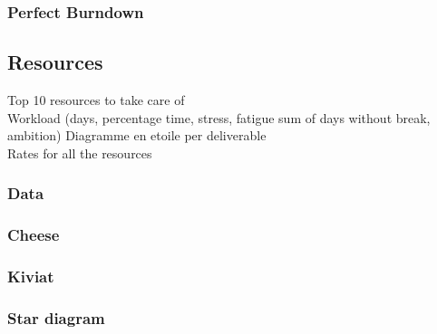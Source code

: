 \documentclass[8pt]{article} %
\begin{document}



\subsubsection{Perfect Burndown}
%


%

\subsection{Resources}

Top 10 resources to take care of\\
Workload (days, percentage time, stress, fatigue sum of days without break, ambition)
Diagramme en etoile per deliverable\\
Rates for all the resources

\subsubsection{Data}

%
\subsubsection{Cheese}


\subsubsection{Kiviat}


\subsubsection{Star diagram}
\end{document}
